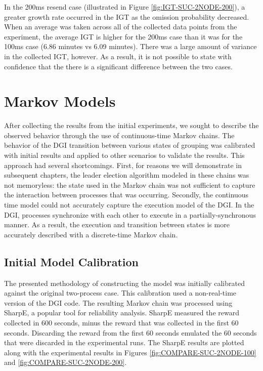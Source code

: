 In the 200ms resend case (illustrated in Figure \ref{fig:IGT-SUC-2NODE-200}), a greater growth rate occurred in the \ac{IGT} as the omission probability decreased.
When an average was taken across all of the collected data points from the experiment, the average \ac{IGT} is higher for the 200ms case than it was for the 100ms case (6.86 minutes vs 6.09 minutes).
There was a large amount of variance in the collected \ac{IGT}, however.
As a result, it is not possible to state with confidence that the there is a significant difference between the two cases.

\section{Markov Models}

After collecting the results from the initial experiments, we sought to describe the observed behavior through the use of continuous-time Markov chains.
The behavior of the DGI transition between various states of grouping was calibrated with initial results and applied to other scenarios to validate the results.
This approach had several shortcomings.
First, for reasons we will demonstrate in subsequent chapters, the leader election algorithm modeled in these chains was not memoryless: the state used in the Markov chain was not sufficient to capture the interaction between processes that was occurring.
Secondly, the continuous time model could not accurately capture the execution model of the DGI.
In the DGI, processes synchronize with each other to execute in a partially-synchronous manner.
As a result, the execution and transition between states is more accurately described with a discrete-time Markov chain.

\subsection{Initial Model Calibration}

The presented methodology of constructing the model was initially calibrated against the original two-process case.
This calibration used a non-real-time version of the DGI code.
The resulting Markov chain was processed using SharpE\cite{SHARPE}\cite{SHARPE2}, a popular tool for reliability analysis.
SharpE measured the reward collected in 600 seconds, minus the reward that was collected in the first 60 seconds. 
Discarding the reward from the first 60 seconds emulated the 60 seconds that were discarded in the experimental runs.
The SharpE results are plotted along with the experimental results in Figures \ref{fig:COMPARE-SUC-2NODE-100} and \ref{fig:COMPARE-SUC-2NODE-200}.

